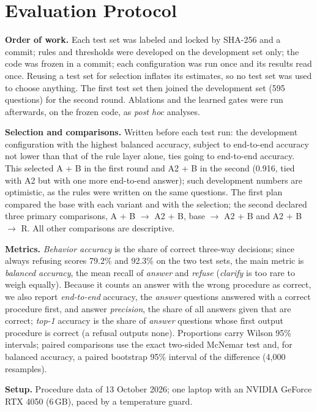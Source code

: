 \section{Evaluation Protocol}

\textbf{Order of work.} Each test set was labeled and locked by SHA-256 and a commit; rules and thresholds were developed on the
development set only; the code was frozen in a commit; each configuration was run once and its results read once. Reusing a test set for
selection inflates its estimates\cite{dwork2015}, so no test set was used to choose anything. The first test set then joined the development set (595 questions) for the second round. Ablations and the
learned gates were run afterwards, on the frozen code, as \emph{post hoc} analyses.

\textbf{Selection and comparisons.} Written before each test run: the development configuration with the highest balanced accuracy,
subject to end-to-end accuracy not lower than that of the rule layer alone, ties going to end-to-end accuracy. This selected A + B in the
first round and A2 + B in the second (0.916, tied with A2 but with one more end-to-end answer); such development numbers are optimistic, as the rules were written on the same questions. The first plan
compared the base with each variant and with the selection; the second declared three primary comparisons, A + B $\rightarrow$ A2 + B,
base $\rightarrow$ A2 + B and A2 + B $\rightarrow$ R. All other comparisons are descriptive.

\textbf{Metrics.} \emph{Behavior accuracy} is the share of correct three-way decisions; since always refusing scores 79.2\% and 92.3\% on the
two test sets, the main metric is \emph{balanced accuracy}, the mean recall of \emph{answer} and \emph{refuse}\cite{brodersen2010}
(\emph{clarify} is too rare to weigh equally). Because it counts an answer with the wrong procedure as correct, we also report
\emph{end-to-end} accuracy, the \emph{answer} questions answered with a correct procedure first, and answer \emph{precision}, the share of
all answers given that are correct; \emph{top-1} accuracy is the share of \emph{answer} questions whose first output procedure is
correct (a refusal outputs none). Proportions carry Wilson 95\% intervals\cite{wilson1927}; paired comparisons use the exact two-sided
McNemar test\cite{mcnemar1947} and, for balanced accuracy, a paired bootstrap 95\% interval of the difference (4,000 resamples).

\textbf{Setup.} Procedure data of 13 October 2026; one laptop with an NVIDIA GeForce RTX 4050 (6\,GB), paced by a temperature guard.
